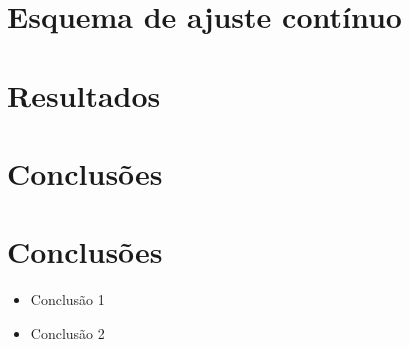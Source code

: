 \documentclass[11pt,twoside]{article}
\begin{document}
{\section{Esquema de ajuste contínuo}

\section{Resultados}
\section{Conclusões}
%











\section{Conclusões}

\begin{itemize}

\item Conclusão 1

\item Conclusão 2


\end{itemize}





{\footnotesize%









}}
\end{document}
